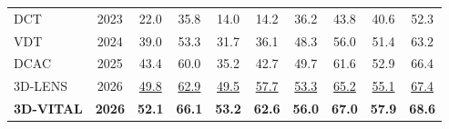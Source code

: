 \documentclass[border=4pt]{standalone}
\begin{document}
\begin{tabular}{l c cccc cccc}
            DCT & 2023
            & 22.0 & 35.8 & 14.0 & 14.2
            & 36.2 & 43.8 & 40.6 & 52.3 \\

            VDT & 2024
            & 39.0 & 53.3 & 31.7 & 36.1
            & 48.3 & 56.0 & 51.4 & 63.2 \\

            DCAC & 2025
            & 43.4 & 60.0 & 35.2 & 42.7
            & 49.7 & 61.6 & 52.9 & 66.4 \\

            \midrule

            3D-LENS & 2026
            & \underline{49.8} & \underline{62.9} & \underline{49.5} & \underline{57.7}
            & \underline{53.3} & \underline{65.2} & \underline{55.1} & \underline{67.4} \\

            \textbf{3D-VITAL} & \textbf{2026}
            & \textbf{52.1} & \textbf{66.1} & \textbf{53.2} & \textbf{62.6}
            & \textbf{56.0} & \textbf{67.0} & \textbf{57.9} & \textbf{68.6} \\

            \bottomrule
        \end{tabular}
\end{document}
